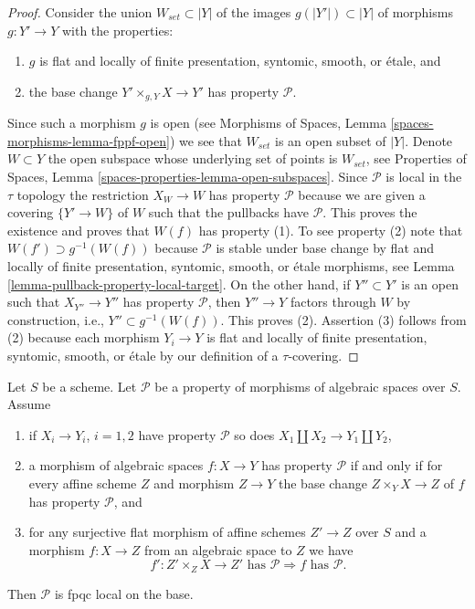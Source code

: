 \begin{proof}
Consider the union $W_{set} \subset |Y|$ of the images
$g(|Y'|) \subset |Y|$ of morphisms $g : Y' \to Y$ with the properties:
\begin{enumerate}
\item $g$ is flat and locally of finite presentation, syntomic,
smooth, or \'etale, and
\item the base change $Y' \times_{g, Y} X \to Y'$ has property
$\mathcal{P}$.
\end{enumerate}
Since such a morphism $g$ is open (see
Morphisms of Spaces, Lemma \ref{spaces-morphisms-lemma-fppf-open})
we see that $W_{set}$ is an open subset of $|Y|$. Denote $W \subset Y$
the open subspace whose underlying set of points is $W_{set}$, see
Properties of Spaces, Lemma \ref{spaces-properties-lemma-open-subspaces}.
Since $\mathcal{P}$ is local in the $\tau$ topology the restriction
$X_W \to W$ has property $\mathcal{P}$ because we are given a covering
$\{Y' \to W\}$ of $W$ such that the pullbacks have $\mathcal{P}$.
This proves the existence and proves that $W(f)$ has property (1).
To see property (2) note that $W(f') \supset g^{-1}(W(f))$ because
$\mathcal{P}$ is stable under base change by flat and locally of finite
presentation, syntomic, smooth, or \'etale morphisms, see
Lemma \ref{lemma-pullback-property-local-target}.
On the other hand, if $Y'' \subset Y'$ is an open such that
$X_{Y''} \to Y''$ has property $\mathcal{P}$, then $Y'' \to Y$ factors
through $W$ by construction, i.e., $Y'' \subset g^{-1}(W(f))$. This
proves (2). Assertion (3) follows from (2) because each morphism
$Y_i \to Y$ is flat and locally of finite presentation, syntomic,
smooth, or \'etale by our definition of a $\tau$-covering.
\end{proof}

\begin{lemma}
\label{lemma-descending-properties-morphisms}
Let $S$ be a scheme. Let $\mathcal{P}$ be a property of morphisms of
algebraic spaces over $S$. Assume
\begin{enumerate}
\item if $X_i \to Y_i$, $i = 1, 2$ have property $\mathcal{P}$ so
does $X_1 \amalg X_2 \to Y_1 \amalg Y_2$,
\item a morphism of algebraic spaces $f : X \to Y$ has property
$\mathcal{P}$ if and only if for every affine scheme $Z$ and
morphism $Z \to Y$ the base change $Z \times_Y X \to Z$ of $f$
has property $\mathcal{P}$, and
\item for any surjective flat morphism of affine schemes
$Z' \to Z$ over $S$ and a morphism $f : X \to Z$ from an algebraic space
to $Z$ we have
$$
f' : Z' \times_Z X \to Z'\text{ has }\mathcal{P}
\Rightarrow
f\text{ has }\mathcal{P}.
$$
\end{enumerate}
Then $\mathcal{P}$ is fpqc local on the base.
\end{lemma}

